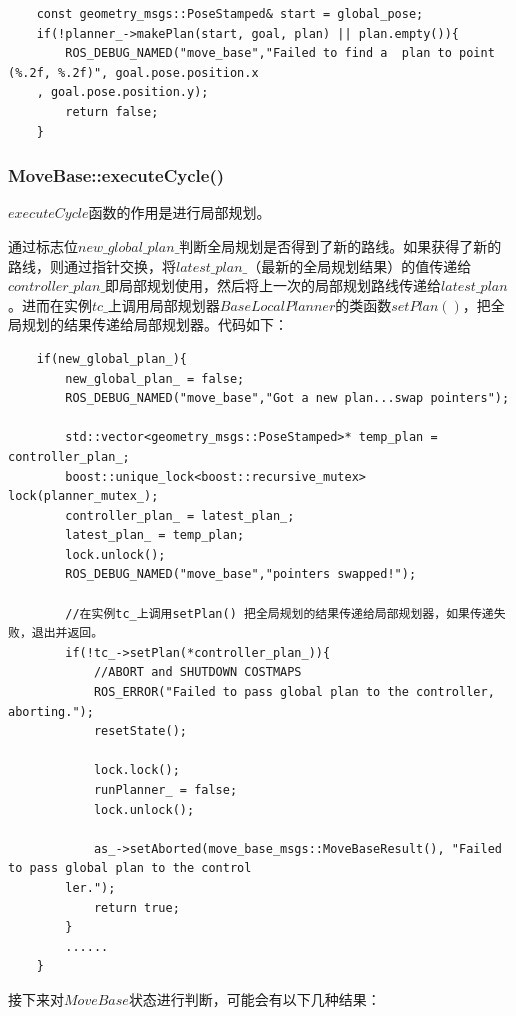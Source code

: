 \documentclass[9pt, oneside]{book}
\begin{document}
\footnotesize
\begin{verbatim}
    const geometry_msgs::PoseStamped& start = global_pose;
    if(!planner_->makePlan(start, goal, plan) || plan.empty()){
        ROS_DEBUG_NAMED("move_base","Failed to find a  plan to point (%.2f, %.2f)", goal.pose.position.x
    , goal.pose.position.y);
        return false;
    }
\end{verbatim}
\normalsize

\subsubsection{MoveBase::executeCycle()}

$executeCycle$函数的作用是进行局部规划。

通过标志位$new\_global\_plan\_$判断全局规划是否得到了新的路线。如果获得了新的路线，则通过指针交换，将$latest\_plan\_$（最新的全局规划结果）的值传递给$controller\_plan\_$即局部规划使用，然后将上一次的局部规划路线传递给$latest\_plan$。进而在实例$tc\_$上调用局部规划器$BaseLocalPlanner$的类函数$setPlan()$，把全局规划的结果传递给局部规划器。代码如下：

\footnotesize
\begin{verbatim}
    if(new_global_plan_){
        new_global_plan_ = false;
        ROS_DEBUG_NAMED("move_base","Got a new plan...swap pointers");

        std::vector<geometry_msgs::PoseStamped>* temp_plan = controller_plan_;
        boost::unique_lock<boost::recursive_mutex> lock(planner_mutex_);
        controller_plan_ = latest_plan_;
        latest_plan_ = temp_plan;
        lock.unlock();
        ROS_DEBUG_NAMED("move_base","pointers swapped!");

        //在实例tc_上调用setPlan() 把全局规划的结果传递给局部规划器，如果传递失败，退出并返回。
        if(!tc_->setPlan(*controller_plan_)){
            //ABORT and SHUTDOWN COSTMAPS
            ROS_ERROR("Failed to pass global plan to the controller, aborting.");
            resetState();

            lock.lock();
            runPlanner_ = false;
            lock.unlock();

            as_->setAborted(move_base_msgs::MoveBaseResult(), "Failed to pass global plan to the control
        ler.");
            return true;
        }
        ......
    }
\end{verbatim}
\normalsize

接下来对$MoveBase$状态进行判断，可能会有以下几种结果：
\end{document}
